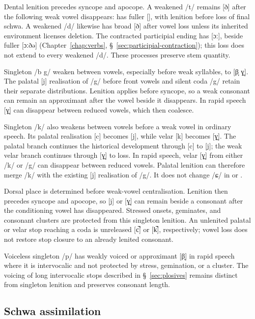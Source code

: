 Dental lenition precedes syncope and apocope. A weakened /t/ remains [ð] after the following weak vowel disappears:  has fuller [], with lenition before loss of final schwa. A weakened /d/ likewise has broad [ð] after vowel loss unless its inherited environment licenses deletion. The contracted participial ending  has [ɔː], beside fuller [ɔːðə] (Chapter~\ref{chap:verbs}, \S~\ref{sec:participial-contraction}); this loss does not extend to every weakened /d/. These processes preserve stem quantity.

Singleton /b g/ weaken between vowels, especially before weak syllables, to [β̞ ɣ̞]. The palatal [j] realisation of /g/ before front vowels and silent coda /g/ retain their separate distributions. Lenition applies before syncope, so a weak consonant can remain an approximant after the vowel beside it disappears. In rapid speech [ɣ̞] can disappear between reduced vowels, which then coalesce.

Singleton /k/ also weakens between vowels before a weak vowel in ordinary speech. Its palatal realisation [c] becomes [j], while velar [k] becomes [ɣ̞]. The palatal branch continues the historical development through [c] to [j]; the weak velar branch continues through [ɣ̞] to loss. In rapid speech, velar [ɣ̞] from either /k/ or /g/ can disappear between reduced vowels. Palatal lenition can therefore merge /k/ with the existing [j] realisation of /g/. It does not change /ɕ/ in  or .

Dorsal place is determined before weak-vowel centralisation. Lenition then precedes syncope and apocope, so [j] or [ɣ̞] can remain beside a consonant after the conditioning vowel has disappeared. Stressed onsets, geminates, and consonant clusters are protected from this singleton lenition. An unlenited palatal or velar stop reaching a coda is unreleased [c̚] or [k̚], respectively; vowel loss does not restore stop closure to an already lenited consonant.

Voiceless singleton /p/ has weakly voiced or approximant [β̞] in rapid speech where it is intervocalic and not protected by stress, gemination, or a cluster. The voicing of long intervocalic stops described in \S~\ref{sec:plosives} remains distinct from singleton lenition and preserves consonant length.

\subsection{Schwa assimilation}
\label{sec:schwa-assimilation}

